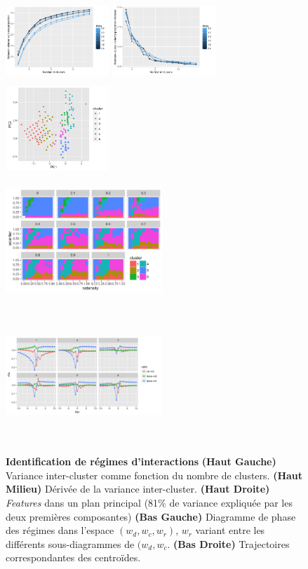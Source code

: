 \documentclass[french]{./sageo}
\begin{document}
\begin{figure}[h]
\centering
\includegraphics[width=3.9cm,height=3.2cm]{figures/ccoef-knum_valuesFALSE_theta05-3.pdf}
\includegraphics[width=3.9cm,height=3.2cm]{figures/dccoef-knum_valuesFALSEtheta05-3.pdf}
\includegraphics[width=3.9cm,height=3.2cm]{figures/clusters-PCA-features_valuesFALSEtheta2_k6}\\
\includegraphics[width=5.9cm,height=5cm]{figures/clusters-paramfacet_valuesFALSEtheta2_k6}
\includegraphics[width=5.9cm,height=5cm]{figures/clusters-centertrajs-facetclust_valuesFALSEtheta2_k6}
\caption{\textbf{Identification de régimes d'interactions} \textbf{(Haut Gauche)} Variance inter-cluster comme fonction du nombre de clusters. \textbf{(Haut Milieu)} Dérivée de la variance inter-cluster. \textbf{(Haut Droite)} \emph{Features} dans un plan principal (81\% de variance expliquée par les deux premières composantes) \textbf{(Bas Gauche)} Diagramme de phase des régimes dans l'espace $(w_{d},w_{c},w_{r})$, $w_r$ variant entre les différents sous-diagrammes de $(w_{d},w_{c}$. \textbf{(Bas Droite)} Trajectoires correspondantes des centroïdes.}
\label{fig:clustering}
\end{figure}
\end{document}
